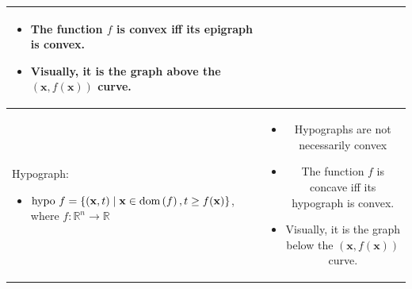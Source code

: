 \documentclass{article}
\newcommand{\dom}[1]{\ensuremath{\textnormal{dom}\left(#1\right)}} %
\begin{document}
\begin{xltabular}{\textwidth}{|A|C|}
\begin{itemize}[leftmargin=*]
		\item The function \(f\) is convex iff its epigraph is convex.
		\item Visually, it is the graph above the \((\mathbf{x}, f(\mathbf{x}))\) curve.
	\end{itemize}\\
	\hline
	Hypograph:
	\begin{itemize}[leftmargin=*]
		\item \(\textnormal{hypo } f = \{(\mathbf{x}, t)\mid \mathbf{x} \in \dom{f}, t\geq f(\mathbf{x})\}\), where \(f: \mathbb{R}^{n} \rightarrow \mathbb{R}\)
	\end{itemize} & \vspace{-3.5ex}
	\begin{itemize}[leftmargin=*]
		\item Hypographs are not necessarily convex
		\item The function \(f\) is concave iff its hypograph is convex.
		\item Visually, it is the graph below the \((\mathbf{x}, f(\mathbf{x}))\) curve.
	\end{itemize}\\
	\hline
\end{xltabular}
\end{document}
